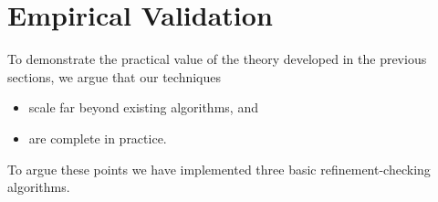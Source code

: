 \section{Empirical Validation}
\label{sec:exp}

To demonstrate the practical value of the theory developed in the previous
sections, we argue that our techniques
\begin{itemize}

  \item scale far beyond existing algorithms, and

  \item are complete in practice.

\end{itemize}
To argue these points we have implemented three basic refinement-checking
algorithms.

